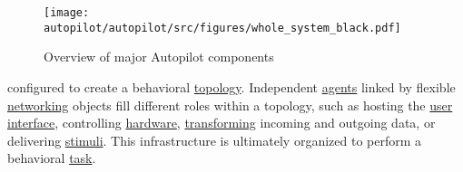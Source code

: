 \begin{figure*}
\texttt{[image: autopilot/autopilot/src/figures/whole\_system\_black.pdf]}
\caption{Overview of major Autopilot components}
\end{figure*}

\break configured to create a behavioral \hyperref[sec:topology]{topology}. Independent \hyperref[sec:agents]{agents} linked by flexible \hyperref[sec:networking]{networking} objects fill different roles within a topology, such as hosting the \hyperref[sec:ui]{user interface}, controlling \hyperref[sec:hardware]{hardware}, \hyperref[sec:transforms]{transforming} incoming and outgoing data, or delivering \hyperref[sec:stim]{stimuli}. This infrastructure is ultimately organized to perform a behavioral \hyperref[sec:tasks]{task}.